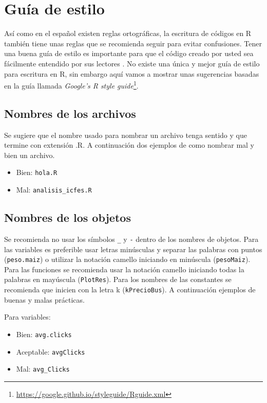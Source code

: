 \documentclass[10pt,]{krantz}
\providecommand{\tightlist}{%
  \setlength{\itemsep}{0pt}\setlength{\parskip}{0pt}}
\renewcommand{\href}[2]{#2\footnote{\url{#1}}}
\begin{document}
\chapter{Guía de estilo}\label{estilo}

Así como en el español existen reglas ortográficas, la escritura de
códigos en R también tiene unas reglas que se recomienda seguir para
evitar confusiones. Tener una buena guía de estilo
 es importante para que el código creado por usted
sea fácilmente entendido por sus lectores \citet{rpackages}. No existe
una única y mejor guía de estilo para escritura en R, sin embargo aquí
vamos a mostrar unas sugerencias basadas en la guía llamada
\href{https://google.github.io/styleguide/Rguide.xml}{\textit{Google's R style guide}}.

\section{Nombres de los archivos}\label{nombres-de-los-archivos}

Se sugiere que el nombre usado para nombrar un archivo tenga sentido y
que termine con extensión .R. A continuación dos ejemplos de como
nombrar mal y bien un archivo.

\begin{itemize}
\tightlist
\item
  Bien: \texttt{hola.R}
\item
  Mal: \texttt{analisis\_icfes.R}
\end{itemize}

\section{Nombres de los objetos}\label{nombres-de-los-objetos}

Se recomienda no usar los símbolos \texttt{\_} y \texttt{-} dentro de
los nombres de objetos. Para las variables es preferible usar letras
minúsculas y separar las palabras con puntos (\texttt{peso.maiz}) o
utilizar la notación camello iniciando en minúscula (\texttt{pesoMaiz}).
Para las funciones se recomienda usar la notación camello iniciando
todas la palabras en mayúscula (\texttt{PlotRes}). Para los nombres de
las constantes se recomienda que inicien con la letra k
(\texttt{kPrecioBus}). A continuación ejemplos de buenas y malas
prácticas.

Para variables:

\begin{itemize}
    \item Bien: \verb|avg.clicks|
    \item Aceptable: \verb|avgClicks|
    \item Mal: \verb|avg_Clicks|
\end{itemize}
\end{document}
